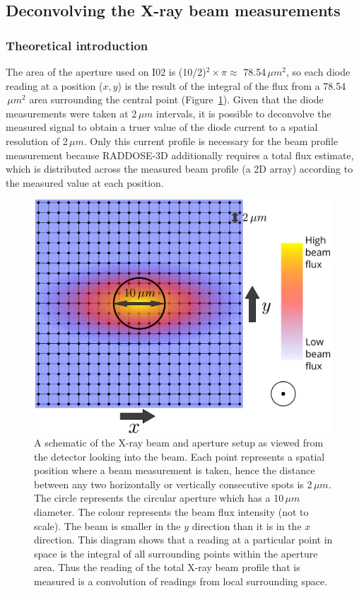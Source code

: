 \subsection{Deconvolving the X-ray beam measurements}
\label{sub:Deconvolving the X-ray beam measurements}

\subsubsection{Theoretical introduction}
\label{subs:Theoretical introduction}
The area of the aperture used on I02 is (10/2)$^2 \times \pi \approx$ 78.54$\,\mu m^2$, so each diode reading at a position ($x, y$) is the result of the integral of the flux from a 78.54$\,\mu m^2$ area surrounding the central point (Figure~\ref{fig:Aperture scan model - DLS}).
Given that the diode measurements were taken at 2$\,\mu m$ intervals, it is possible to deconvolve the measured signal to obtain a truer value of the diode current to a spatial resolution of 2$\,\mu m$.
Only this current profile is necessary for the beam profile measurement because RADDOSE-3D additionally requires a total flux estimate, which is distributed across the measured beam profile (a 2D array) according to the measured value at each position.
\begin{figure}
    \centering
    \includegraphics[width=1\textwidth]{figures/beam/aperture_scan_drawing.pdf}
    \caption[A schematic of the X-ray beam and aperture setup.]{A schematic of the X-ray beam and aperture setup as viewed from the detector looking into the beam.
    Each point represents a spatial position where a beam measurement is taken, hence the distance between any two horizontally or vertically consecutive spots is 2$\,\mu m$.
    The circle represents the circular aperture which has a 10$\,\mu m$ diameter.
    The colour represents the beam flux intensity (not to scale).
    The beam is smaller in the $y$ direction than it is in the $x$ direction.
    This diagram shows that a reading at a particular point in space is the integral of all surrounding points within the aperture area.
    Thus the reading of the total X-ray beam profile that is measured is a convolution of readings from local surrounding space.}
    \label{fig:Aperture scan model - DLS}
\end{figure}

